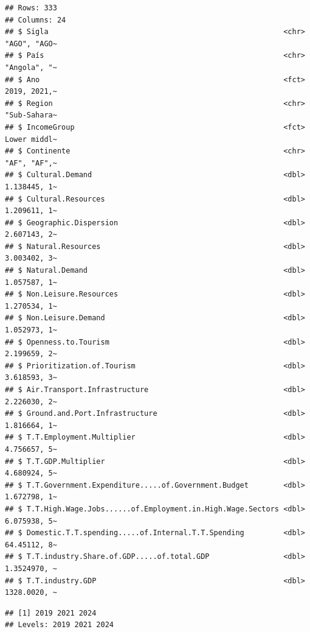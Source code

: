 \documentclass[
]{article}
\newenvironment{Shaded}{\begin{snugshade}}{\end{snugshade}}
\newcommand{\FunctionTok}[1]{\textcolor[rgb]{0.13,0.29,0.53}{\textbf{#1}}}
\newcommand{\NormalTok}[1]{#1}
\newcommand{\SpecialCharTok}[1]{\textcolor[rgb]{0.81,0.36,0.00}{\textbf{#1}}}
\begin{document}
\begin{verbatim}
## Rows: 333
## Columns: 24
## $ Sigla                                                      <chr> "AGO", "AGO~
## $ País                                                       <chr> "Angola", "~
## $ Ano                                                        <fct> 2019, 2021,~
## $ Region                                                     <chr> "Sub-Sahara~
## $ IncomeGroup                                                <fct> Lower middl~
## $ Continente                                                 <chr> "AF", "AF",~
## $ Cultural.Demand                                            <dbl> 1.138445, 1~
## $ Cultural.Resources                                         <dbl> 1.209611, 1~
## $ Geographic.Dispersion                                      <dbl> 2.607143, 2~
## $ Natural.Resources                                          <dbl> 3.003402, 3~
## $ Natural.Demand                                             <dbl> 1.057587, 1~
## $ Non.Leisure.Resources                                      <dbl> 1.270534, 1~
## $ Non.Leisure.Demand                                         <dbl> 1.052973, 1~
## $ Openness.to.Tourism                                        <dbl> 2.199659, 2~
## $ Prioritization.of.Tourism                                  <dbl> 3.618593, 3~
## $ Air.Transport.Infrastructure                               <dbl> 2.226030, 2~
## $ Ground.and.Port.Infrastructure                             <dbl> 1.816664, 1~
## $ T.T.Employment.Multiplier                                  <dbl> 4.756657, 5~
## $ T.T.GDP.Multiplier                                         <dbl> 4.680924, 5~
## $ T.T.Government.Expenditure.....of.Government.Budget        <dbl> 1.672798, 1~
## $ T.T.High.Wage.Jobs......of.Employment.in.High.Wage.Sectors <dbl> 6.075938, 5~
## $ Domestic.T.T.spending.....of.Internal.T.T.Spending         <dbl> 64.45112, 8~
## $ T.T.industry.Share.of.GDP.....of.total.GDP                 <dbl> 1.3524970, ~
## $ T.T.industry.GDP                                           <dbl> 1328.0020, ~
\end{verbatim}

\begin{Shaded}
\end{Shaded}

\begin{verbatim}
## [1] 2019 2021 2024
## Levels: 2019 2021 2024
\end{verbatim}
\end{document}
